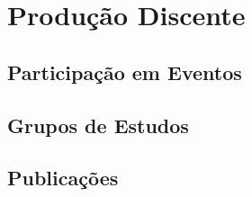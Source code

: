 \chapter{Produção Discente}
\label{ch:02-atividadesacademicas}

\section{Participação em Eventos}
\section{Grupos de Estudos}
\section{Publicações}
